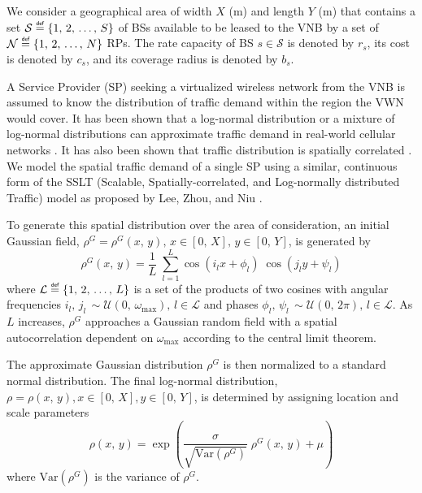\documentclass[12pt,dvips]{report}
\newcommand\myeq{\mathrel{\overset{\makebox[0pt]{\mbox{\normalfont\tiny\sffamily def}}}{=}}}
\begin{document}
We consider a geographical area of width $X$ (m) and length $Y$ (m) that contains a set $\mathcal{S} \myeq \left\{1,\, 2,\, \ldots,\, S\right\}$ of BSs available to be leased to the VNB by a set of $\mathcal{N} \myeq \left\{1,\, 2,\, \ldots,\, N\right\}$ RPs.  The rate capacity of BS $s \in \mathcal{S}$ is denoted by $r_s$, its cost is denoted by $c_s$, and its coverage radius is denoted by $b_s$.

A Service Provider (SP) seeking a virtualized wireless network from the VNB is assumed to know the distribution of traffic demand within the region the VWN would cover.  It has been shown that a log-normal distribution or a mixture of log-normal distributions can approximate traffic demand in real-world cellular networks \cite{686105, 5936263}.  It has also been shown that traffic distribution is spatially correlated \cite{5936263, eigenplaces}.  We model the spatial traffic demand of a single SP using a similar, continuous form of the SSLT (Scalable, Spatially-correlated, and Log-normally distributed Traffic) model as proposed by Lee, Zhou, and Niu \cite{6554749}.

To generate this spatial distribution over the area of consideration, an initial Gaussian field, $\rho^G = \rho^G\left(x,\, y\right),\, x \in \left[0,\, X\right],\, y \in \left[0,\, Y\right]$, is generated by
\begin{equation}
\rho^G\left(x,\, y\right)=\frac{1}{L} \; \sum_{l=1}^L \cos\left(i_lx+\phi_l\right) \; \cos\left(j_ly+\psi_l\right)
\end{equation} \label{eq:rhoG}
\noindent where $\mathcal{L} \myeq \left\{1,\, 2,\, \ldots,\, L\right\}$ is a set of the products of two cosines with angular frequencies $i_l,\, j_l\, \sim \mathcal{U}\left(0,\, \omega_{\max}\right),\, l \in \mathcal{L}$ and phases $\phi_l,\, \psi_l\, \sim \mathcal{U}\left(0,\, 2\pi\right),\, l \in \mathcal{L}$.  As $L$ increases, $\rho^G$ approaches a Gaussian random field with a spatial autocorrelation dependent on $\omega_{\max}$ according to the central limit theorem.

The approximate Gaussian distribution $\rho^G$ is then normalized to a standard normal distribution.  The final log-normal distribution, $\rho = \rho\left(x,\, y\right), x \in [0,\, X], y \in [0,\, Y]$, is determined by assigning location and scale parameters
\begin{equation}
\rho\left(x,\, y\right) = \exp\left(\frac{\sigma}{\sqrt{\text{Var}\left(\rho^G\right)}} \; \rho^G\left(x,\, y\right)+\mu\right)
\end{equation} \label{eq:rhoLN}
\noindent where $\text{Var}\left(\rho^G\right)$ is the variance of $\rho^G$.
\end{document}
